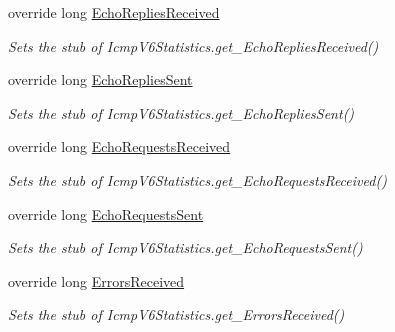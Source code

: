 \begin{DoxyCompactItemize}
override long \hyperlink{class_system_1_1_net_1_1_network_information_1_1_fakes_1_1_stub_icmp_v6_statistics_ad514a060b84588edf85995cb1de7c7ac}{Echo\-Replies\-Received}
\begin{DoxyCompactList}\small\item\em Sets the stub of Icmp\-V6\-Statistics.\-get\-\_\-\-Echo\-Replies\-Received()\end{DoxyCompactList}\item 
override long \hyperlink{class_system_1_1_net_1_1_network_information_1_1_fakes_1_1_stub_icmp_v6_statistics_a7a54cf1e39e60cb9cfa7fadba5e68efd}{Echo\-Replies\-Sent}
\begin{DoxyCompactList}\small\item\em Sets the stub of Icmp\-V6\-Statistics.\-get\-\_\-\-Echo\-Replies\-Sent()\end{DoxyCompactList}\item 
override long \hyperlink{class_system_1_1_net_1_1_network_information_1_1_fakes_1_1_stub_icmp_v6_statistics_ac70a6473feb7dc8d06289d58c8bbfbdf}{Echo\-Requests\-Received}
\begin{DoxyCompactList}\small\item\em Sets the stub of Icmp\-V6\-Statistics.\-get\-\_\-\-Echo\-Requests\-Received()\end{DoxyCompactList}\item 
override long \hyperlink{class_system_1_1_net_1_1_network_information_1_1_fakes_1_1_stub_icmp_v6_statistics_a0ede8f543833faabbeb3fcc4b3df4758}{Echo\-Requests\-Sent}
\begin{DoxyCompactList}\small\item\em Sets the stub of Icmp\-V6\-Statistics.\-get\-\_\-\-Echo\-Requests\-Sent()\end{DoxyCompactList}\item 
override long \hyperlink{class_system_1_1_net_1_1_network_information_1_1_fakes_1_1_stub_icmp_v6_statistics_a116fb4763f8c2a16e269d5b849a19ff4}{Errors\-Received}
\begin{DoxyCompactList}\small\item\em Sets the stub of Icmp\-V6\-Statistics.\-get\-\_\-\-Errors\-Received()\end{DoxyCompactList}\item 

\end{DoxyCompactItemize}
